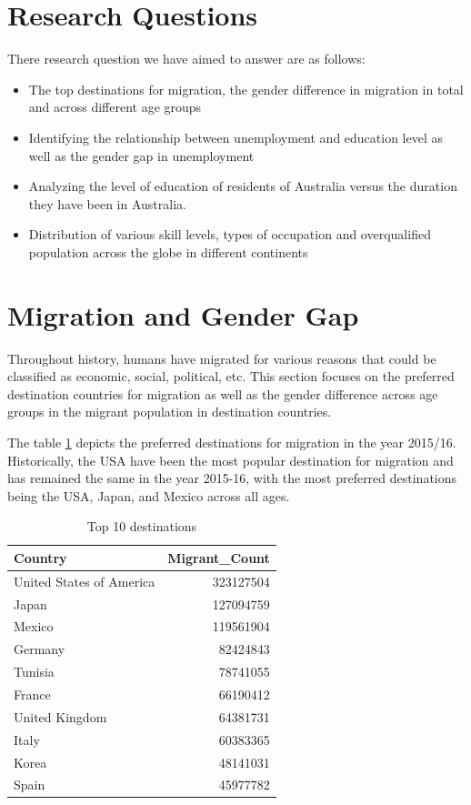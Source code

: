 \documentclass[11pt,a4paper,]{article}
\providecommand{\tightlist}{%
  \setlength{\itemsep}{0pt}\setlength{\parskip}{0pt}}
\begin{document}
\section*{Research Questions}

There research question we have aimed to answer are as follows:

\begin{itemize}
\tightlist
\item
  The top destinations for migration, the gender difference in migration in total and across different age groups
\item
  Identifying the relationship between unemployment and education level as well as the gender gap in unemployment
\item
  Analyzing the level of education of residents of Australia versus the duration they have been in Australia.
\item
  Distribution of various skill levels, types of occupation and overqualified population across the globe in different continents
\end{itemize}

\pagebreak

\section*{Migration and Gender Gap}

Throughout history, humans have migrated for various reasons that could be classified as economic, social, political, etc. This section focuses on the preferred destination countries for migration as well as the gender difference across age groups in the migrant population in destination countries.

The table \ref{tab:topdestinations} depicts the preferred destinations for migration in the year 2015/16. Historically, the USA have been the most popular destination for migration and has remained the same in the year 2015-16, with the most preferred destinations being the USA, Japan, and Mexico across all ages.

\begin{table}

\caption{\label{tab:topdestinations}Top 10 destinations}
\centering
\begin{tabular}[t]{lr}
\toprule
Country & Migrant\_Count\\
\midrule
\rowcolor{gray!6}  United States of America & 323127504\\
Japan & 127094759\\
\rowcolor{gray!6}  Mexico & 119561904\\
Germany & 82424843\\
\rowcolor{gray!6}  Tunisia & 78741055\\
\addlinespace
France & 66190412\\
\rowcolor{gray!6}  United Kingdom & 64381731\\
Italy & 60383365\\
\rowcolor{gray!6}  Korea & 48141031\\
Spain & 45977782\\
\bottomrule
\end{tabular}
\end{table}
\end{document}
